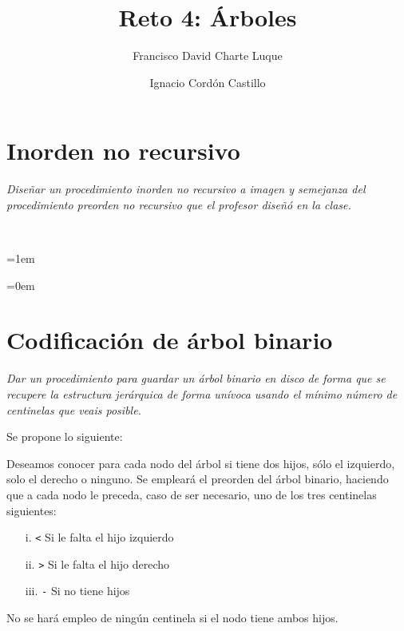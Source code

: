 \documentclass[a4paper,10pt]{scrartcl}
\title{Reto 4: Árboles}
\author{Francisco David Charte Luque\and
        Ignacio Cordón Castillo}
\date{}
\begin{document}
\maketitle
\section{Inorden no recursivo}
        \textit{Diseñar un procedimiento inorden no recursivo a imagen y semejanza
        del procedimiento preorden no recursivo que el profesor diseñó en la clase.}

 \ 
 
 \leftskip=1em
 \small
 \texttt{}
 \normalsize
 
 \leftskip=0em
 \section{Codificación de árbol binario}
         \textit{Dar un procedimiento para guardar un árbol binario en disco de forma que se
         recupere la estructura jerárquica de forma unívoca usando el mínimo número
         de centinelas que veais posible.}
         
  Se propone lo siguiente:
 
 Deseamos conocer para cada nodo del árbol si tiene dos hijos, sólo el
 izquierdo, solo el derecho o ninguno. Se empleará el preorden del árbol
 binario, haciendo que a cada nodo le preceda, caso de ser necesario, uno
 de los tres centinelas siguientes:
  
 \begin{enumerate}
 \item[i.] \texttt{<} Si le falta el hijo izquierdo
 \item[ii.] \texttt{>} Si le falta el hijo derecho
 \item[iii.] \texttt{-} Si no tiene hijos
 \end{enumerate}
 
 No se hará empleo de ningún centinela si el nodo tiene ambos hijos.
   
\end{document}
